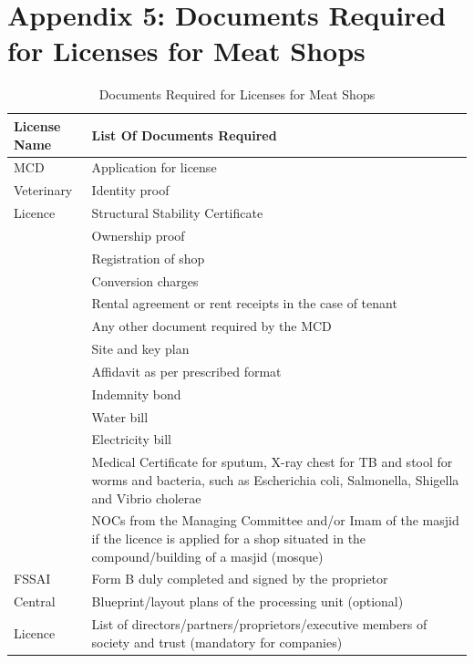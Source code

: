 \documentclass[a4paper, 12pt]{article}
\begin{document}
\section*{Appendix 5: Documents Required for Licenses for Meat Shops}
\begin{longtable}{>{\raggedright}p{2.5cm}>{\raggedright\arraybackslash}p{13cm}}
\caption{Documents Required for Licenses for Meat Shops} \\
\midrule
\endfirsthead 
   License Name & List Of Documents Required \\
    \midrule
    MCD & Application for license \\
    Veterinary & Identity proof \\
    Licence & Structural Stability Certificate \\
    \multicolumn{1}{r}{} & Ownership proof \\
    \multicolumn{1}{r}{} & Registration of shop \\
    \multicolumn{1}{r}{} & Conversion charges \\
    \multicolumn{1}{r}{} & Rental agreement or rent receipts in the case of tenant \\
    \multicolumn{1}{r}{} & Any other document required by the MCD \\
    \multicolumn{1}{r}{} & Site and key plan \\
    \multicolumn{1}{r}{} & Affidavit as per prescribed format \\
    \multicolumn{1}{r}{} & Indemnity bond \\
    \multicolumn{1}{r}{} & Water bill \\
    \multicolumn{1}{r}{} & Electricity bill \\
    \multicolumn{1}{r}{} & Medical Certificate for sputum, X-ray chest for TB and stool for worms and bacteria, such as Escherichia coli, Salmonella, Shigella and Vibrio cholerae \\
    \multicolumn{1}{r}{} & NOCs from the Managing Committee and/or Imam of the masjid if the licence is applied for a shop situated in the compound/building of a masjid (mosque) \\
    \midrule
    FSSAI  & Form B duly completed and signed by the proprietor \\
    Central & Blueprint/layout plans of the processing unit (optional) \\
    Licence & List of directors/partners/proprietors/executive members of society and trust (mandatory for companies) \\

\end{longtable}
\end{document}
